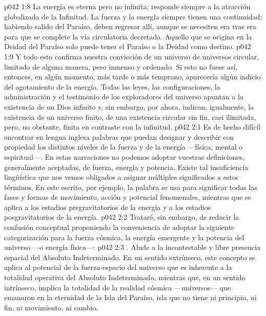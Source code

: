 \vs p042 1:8 La energía es eterna pero no infinita; responde siempre a la atracción globalizada de la Infinitud. La fuerza y la energía siempre tienen una continuidad; habiendo salido del Paraíso, deben regresar allí, aunque se necesiten era tras era para que se complete la vía circulatoria decretada. Aquello que se origina en la Deidad del Paraíso solo puede tener el Paraíso o la Deidad como destino.
\vs p042 1:9 \pc Y todo esto confirma nuestra convicción de un universo de universos circular, limitado de alguna manera, pero inmenso y ordenado. Si esto no fuese así, entonces, en algún momento, más tarde o más temprano, aparecería algún indicio del agotamiento de la energía. Todas las leyes, las configuraciones, la administración y el testimonio de los exploradores del universo apuntan a la existencia de un Dios infinito y, sin embargo, por ahora, indican, igualmente, la existencia de un universo finito, de una existencia circular sin fin, casi ilimitada, pero, no obstante, finita en contraste con la infinitud.
\vs p042 2:1 Es de hecho difícil encontrar en lengua inglesa palabras que puedan designar y describir con propiedad los distintos niveles de la fuerza y de la energía ---física, mental o espiritual---. En estas narraciones no podemos adoptar vuestras definiciones, generalmente aceptadas, de fuerza, energía y potencia. Existe tal insuficiencia lingüística que nos vemos obligados a asignar múltiples significados a estos términos. En este escrito, por ejemplo, la palabra  se usa para significar todas las fases y formas de movimiento, acción y potencial fenomenales, mientras que  se aplica a los estadios pregravitatorios de la energía y  a los estadios posgravitatorios de la energía.
\vs p042 2:2 Trataré, sin embargo, de reducir la confusión conceptual proponiendo la conveniencia de adoptar la siguiente categorización para la fuerza cósmica, la energía emergente y la potencia del universo ---o energía física---:
\vs p042 2:3 . Alude a la incontestable y libre presencia espacial del Absoluto Indeterminado. En un sentido extrínseco, este concepto se aplica al potencial de la fuerza\hyp{}espacio del universo que es inherente a la totalidad operativa del Absoluto Indeterminado, mientras que, en un sentido intrínseco, implica la totalidad de la realidad cósmica ---universos--- que emanaron en la eternidad de la Isla del Paraíso, isla que no tiene ni principio, ni fin, ni movimiento, ni cambio.

